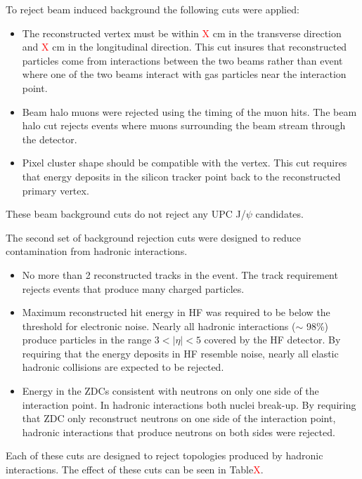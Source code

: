       To reject beam induced background the following cuts were applied:
      \begin{itemize}
        \item The reconstructed vertex must be within \textcolor{red}{X} cm in 
          the transverse direction and \textcolor{red}{X} cm in the 
          longitudinal direction. This cut insures that reconstructed particles 
          come from interactions between the two beams rather than event where 
          one of the two beams interact with gas particles near the interaction 
          point. 
  	    \item Beam halo muons were rejected using the timing of the muon hits.
              The beam halo cut rejects events where muons surrounding the beam 
              stream through the detector. 
  	    \item Pixel cluster shape should be compatible with the vertex. 
          This cut requires that energy deposits in the silicon tracker point 
            back to the reconstructed  primary vertex. 
      \end{itemize}
      These beam background cuts do not reject any UPC J/$\psi$ candidates. 
  
      The second set of background rejection cuts were designed to 
        reduce contamination from hadronic interactions. 
      \begin{itemize}
  	    \item No more than 2 reconstructed tracks in the event.
          The track requirement rejects events that produce many charged 
          particles.
  	    \item Maximum reconstructed hit energy in HF was required to be below 
            the threshold for electronic noise. 
          Nearly all hadronic interactions ($\sim$ 98\%) produce particles in 
            the range $3<|\eta|<5$ covered by the HF detector.
          By requiring that the energy deposits in HF resemble noise, nearly all
            elastic hadronic collisions are expected to be rejected.
  	    \item Energy in the ZDCs consistent with neutrons on only one side 
            of the interaction point.
          In hadronic interactions both nuclei break-up. 
          By requiring that ZDC only reconstruct neutrons on one side of the 
            interaction point, hadronic interactions that produce neutrons on 
            both sides were rejected.
      \end{itemize}
      Each of these cuts are designed to reject topologies produced by hadronic
        interactions.
      The effect of these cuts can be seen in Table\textcolor{red}{X}.

